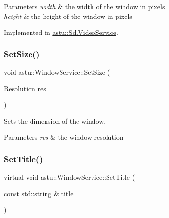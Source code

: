 \begin{DoxyParams}{Parameters}
{\em width} & the width of the window in pixels \\
\hline
{\em height} & the height of the window in pixels \\
\hline
\end{DoxyParams}


Implemented in \hyperlink{classastu_1_1SdlVideoService_a1c8d729ef42024bc0cc5065ecc6631c8}{astu\+::\+Sdl\+Video\+Service}.

\mbox{\label{classastu_1_1WindowService_a344f90996e33b7861aa8870860ddd38f}} 
\subsubsection{\texorpdfstring{Set\+Size()}{SetSize()}\hspace{0.1cm}{\footnotesize\ttfamily [2/2]}}
{\footnotesize\ttfamily void astu\+::\+Window\+Service\+::\+Set\+Size (\begin{DoxyParamCaption}\item[{\hyperlink{group__srv__group_ga68a91c7015964dbdea802829ae5ccb3c}{Resolution}}]{res }\end{DoxyParamCaption})\hspace{0.3cm}{\ttfamily [inline]}}

Sets the dimension of the window.


\begin{DoxyParams}{Parameters}
{\em res} & the window resolution \\
\hline
\end{DoxyParams}
\mbox{\label{classastu_1_1WindowService_a298dcaad372f611f14edb4ad33044efd}} 
\subsubsection{\texorpdfstring{Set\+Title()}{SetTitle()}}
{\footnotesize\ttfamily virtual void astu\+::\+Window\+Service\+::\+Set\+Title (\begin{DoxyParamCaption}\item[{const std\+::string \&}]{title }\end{DoxyParamCaption})\hspace{0.3cm}{\ttfamily [pure virtual]}}

